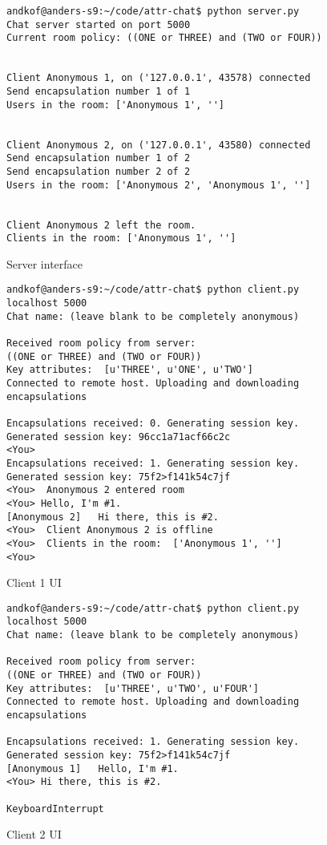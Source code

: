 \begin{figure}
\centering
\begin{lstlisting}[breaklines=true, backgroundcolor=\color{mygray} ]
andkof@anders-s9:~/code/attr-chat$ python server.py 
Chat server started on port 5000
Current room policy: ((ONE or THREE) and (TWO or FOUR))


Client Anonymous 1, on ('127.0.0.1', 43578) connected
Send encapsulation number 1 of 1
Users in the room: ['Anonymous 1', '']


Client Anonymous 2, on ('127.0.0.1', 43580) connected
Send encapsulation number 1 of 2
Send encapsulation number 2 of 2
Users in the room: ['Anonymous 2', 'Anonymous 1', '']


Client Anonymous 2 left the room.
Clients in the room: ['Anonymous 1', '']

\end{lstlisting}
\caption{Server interface}
\label{fig:server-output}
\end{figure}


\begin{figure}
\centering
\begin{lstlisting}[breaklines=true, backgroundcolor=\color{mygray} ]
andkof@anders-s9:~/code/attr-chat$ python client.py localhost 5000
Chat name: (leave blank to be completely anonymous) 

Received room policy from server: 
((ONE or THREE) and (TWO or FOUR))
Key attributes:  [u'THREE', u'ONE', u'TWO']
Connected to remote host. Uploading and downloading encapsulations

Encapsulations received: 0. Generating session key.
Generated session key: 96cc1a71acf66c2c
<You> 
Encapsulations received: 1. Generating session key.
Generated session key: 75f2>f141k54c7jf 
<You>  Anonymous 2 entered room
<You> Hello, I'm #1.
[Anonymous 2]   Hi there, this is #2.
<You>  Client Anonymous 2 is offline
<You>  Clients in the room:  ['Anonymous 1', '']
<You> 

\end{lstlisting}
\caption{Client 1 UI}
\label{fig:client1-output}
\end{figure}


\begin{figure}
\centering
\begin{lstlisting}[breaklines=true, backgroundcolor=\color{mygray} ]
andkof@anders-s9:~/code/attr-chat$ python client.py localhost 5000
Chat name: (leave blank to be completely anonymous) 

Received room policy from server: 
((ONE or THREE) and (TWO or FOUR))
Key attributes:  [u'THREE', u'TWO', u'FOUR']
Connected to remote host. Uploading and downloading encapsulations

Encapsulations received: 1. Generating session key.
Generated session key: 75f2>f141k54c7jf
[Anonymous 1]   Hello, I'm #1.
<You> Hi there, this is #2.

KeyboardInterrupt
\end{lstlisting}
\caption{Client 2 UI}
\label{fig:client2-output}
\end{figure}

